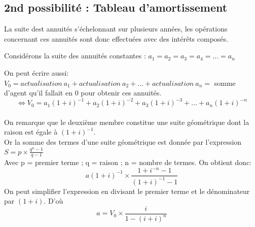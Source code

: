 	\subsection{2nd possibilité : Tableau d'amortissement}
	La suite dest annuités s'échelonnant sur plusieurs années, les opérations concernant ces annuités sont donc effectuées avec des intérêts composés.

	Considérons la suite des annuités constantes : $a_1 = a_2 = a_3 = a_4 = \dots = a_n$ 

	On peut écrire aussi: $V_0 = actualisation~a_1 + actualisation~a_2 + \dots + actualisation~a_n =$ somme d'agent qu'il fallait en 0 pour obtenir ces annuités. \\
	$$\Leftrightarrow V_0 = a_1(1+i)^{-1} + a_2(1+i)^{-2} + a_3(1+i)^{-3} + \dots + a_n(1+i)^{-n}$$
	\paragraph{}
	On remarque que le deuxième membre constitue une suite géométrique dont la raison est égale à $(1+i)^{-1}$.\\
	Or la somme des termes d'une suite géométrique est donnée par l'expression $S=p \times \frac{q^n -1}{q - 1}$\\
	Avec p = premier terme ; q = raison ; n = nombre de termes. On obtient donc:
	$$a(1+i)^{-1} \times \frac{1+i^{-n}-1}{(1+i)^{-1} - 1}$$
	On peut simplifier l'expression en divisant le premier terme et le dénominateur par $(1+i)$. D'où
	$$a = V_0 \times \frac{i}{1-(i+i)^n}$$


